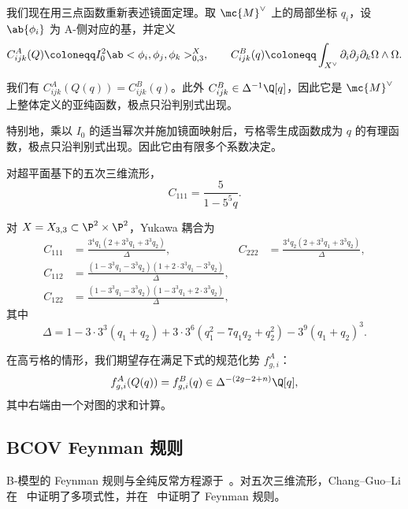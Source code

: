 我们现在用三点函数重新表述镜面定理。取 \(\mc{M}^{\vee}\) 上的局部坐标 \(q_i\)，设 \(\ab\{\phi_i\}\) 为 A-侧对应的基，并定义
\[ C^A_{ijk}(Q) \coloneqq I_0^2 \ab<\phi_i, \phi_j, \phi_k>^X_{0,3}, \qquad C^B_{ijk}(q) \coloneqq \int_{X^{\vee}} \partial_i \partial_j \partial_k \Omega \wedge \Omega. \]

\begin{thm}
    我们有 \(C^A_{ijk}(Q(q)) = C^B_{ijk}(q)\)。此外 \(C^B_{ijk} \in \Delta^{-1}\Q[q]\)，因此它是 \(\mc{M}^{\vee}\) 上整体定义的亚纯函数，极点只沿判别式出现。
\end{thm}

特别地，乘以 \(I_0\) 的适当幂次并施加镜面映射后，亏格零生成函数成为 \(q\) 的有理函数，极点只沿判别式出现。因此它由有限多个系数决定。

\begin{exm}
    对超平面基下的五次三维流形，
    \[ C_{111} = \frac{5}{1-5^5 q}. \]
\end{exm}

\begin{exm}
    对 \(X = X_{3,3} \subset \P^2 \times \P^2\)，Yukawa 耦合为
    \begin{align*}
        C_{111} &= \frac{3^4 q_1 (2+3^3q_1+3^3q_2)}{\Delta}, & C_{222} &= \frac{3^4 q_2(2+3^3q_1+3^3q_2)}{\Delta}, \\
        C_{112} &= \frac{(1-3^3q_1-3^3q_2)(1+2\cdot 3^3 q_1 - 3^3 q_2)}{\Delta}, \\
        C_{122} &= \frac{(1-3^3q_1-3^3q_2)(1-3^3q_1+2\cdot3^3q_2)}{\Delta},
    \end{align*}
    其中
    \[ \Delta = 1 - 3\cdot3^3(q_1+q_2) + 3\cdot3^6(q_1^2 - 7q_1q_2+q_2^2) - 3^9(q_1+q_2)^3. \]
\end{exm}

在高亏格的情形，我们期望存在满足下式的规范化势 \(f^A_{g,i}\)：
\[ f^A_{g,i}(Q(q)) = f^B_{g,i}(q) \in \Delta^{-(2g-2+n)}\Q[q], \]
其中右端由一个对图的求和计算。

\subsection{BCOV Feynman 规则}%
\label{sub:The BCOV Feynman rule}

B-模型的 Feynman 规则与全纯反常方程源于~\cite{BCOV1994}。对五次三维流形，Chang--Guo--Li 在~\cite{CGL2021} 中证明了多项式性，并在~\cite{CGL2026} 中证明了 Feynman 规则。

